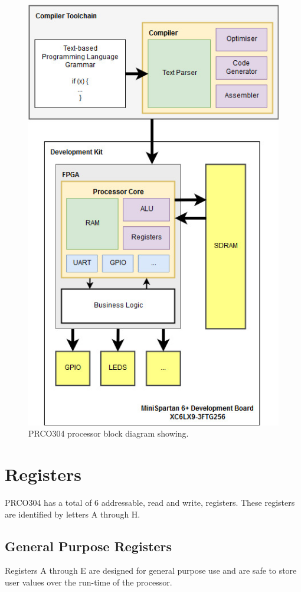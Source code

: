 \documentclass[11pt,a4paper]{report}
\newcommand{\scname}{PRCO304}
\begin{document}
\begin{figure}[H]
\begin{center}
\includegraphics[scale=0.5]{hld}
\end{center}
\caption{\scname{} processor block diagram showing.}
\label{fig:core_hld}
\end{figure}

\section{Registers}
\scname{} has a total of 6 addressable, read and write, registers. These registers are identified by letters A through H.

\subsection{General Purpose Registers}
Registers A through E are designed for general purpose use and are safe to store user values over the run-time of the processor.
\end{document}
